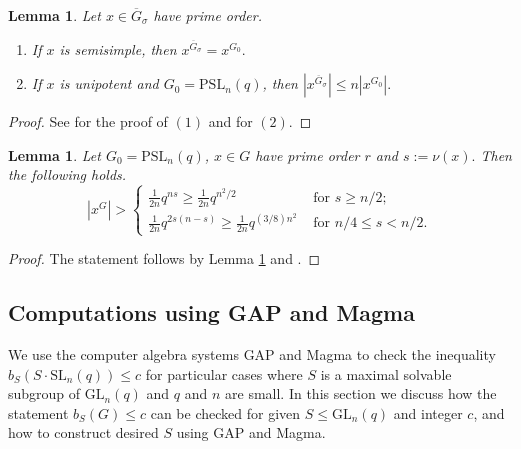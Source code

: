 \documentclass[a4paper,reqno,11pt]{amsart}
\newtheorem{Lem}[Th]{Lemma}
\theoremstyle{definition}
\theoremstyle{remark}
\numberwithin{equation}{section}
\newcommand{\SL}{{\mathrm{SL}}}
\newcommand{\PSL}{{\mathrm{PSL}}}
\newcommand{\GL}{{\mathrm{GL}}}
\begin{document}
\begin{Lem}\label{xGoGs}
Let $x \in \overline{G}_{\sigma}$ have prime order.
\begin{enumerate}[font=\normalfont]
\item If $x$ is semisimple, then $x^{\overline{G}_{\sigma}}=x^{G_0}.$
\item If $x$ is unipotent and $G_0=\PSL_n(q)$, then $|x^{\overline{G}_{\sigma}}| \le n|x^{G_0}|.$
\end{enumerate} 
\end{Lem}
\begin{proof}
See \cite[4.2.2(j)]{gorlyo} for the proof of $(1)$ and \cite[Lemma 3.20]{fpr2} for $(2)$.
\end{proof}

\begin{Lem}\label{lemxGbound}
Let ${G_0}=\PSL_n(q)$, $x \in G$ have prime order $r$ and $s:=\nu(x).$ Then the following holds.
\begin{equation}\label{5uni}
 |x^G| > 
\begin{cases}
  \frac{1}{2n}  q^{ns} \ge \frac{1}{2n} q^{n^2/2}  & \text{ for } s \ge n/2;\\
  \frac{1}{2n} q^{2s(n-s)} \ge  
\frac{1}{2n}   q^{(3/8)n^2}  & \text{ for }  n/4 \le s < n/2.
\end{cases}
\end{equation}
\end{Lem}
\begin{proof}
The statement follows by Lemma \ref{xGoGs} and \cite[Propositions 3.22 and 3.36, Lemmas 3.34 and 3.38]{fpr2}.
\end{proof}

\subsection{Computations using {\sf GAP} and {\sc Magma}}
\label{gapsec}

We use the  computer algebra systems {\sf GAP} \cite{GAP4} and {\sc Magma} \cite{magma}  to check the inequality $b_S(S \cdot \SL_n(q))\le c$ for  particular cases where $S$ is a maximal solvable subgroup of $\GL_n(q)$ and $q$ and $n$ are small. In this section we discuss how the statement $b_S(G)\le c$ can be checked for given  $S \le \GL_n(q)$ and integer $c$, and how to construct desired $S$  using {\sf GAP} and {\sc Magma}.
\end{document}
